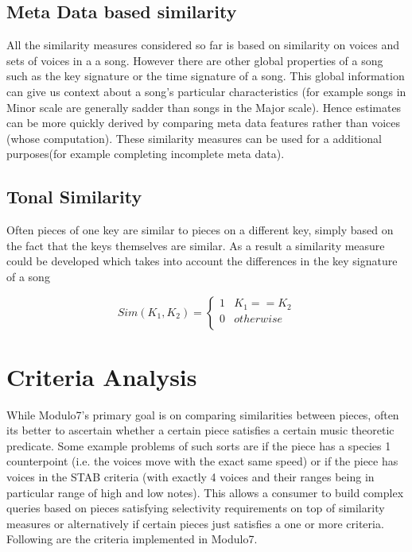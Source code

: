 \subsection{Meta Data based similarity}

\noindent All the similarity measures considered so far is based on similarity on voices and sets of voices in a a song. However there are other global properties of a song such as the key signature or the time signature of a song. This global information can give us context about a song's particular characteristics (for example songs in Minor scale are generally sadder than songs in the Major scale). Hence estimates can be more quickly derived by comparing meta data features rather than voices (whose computation). These similarity measures can be used for a additional purposes(for example completing incomplete meta data). 

\subsection{Tonal Similarity}

\noindent Often pieces of one key are similar to pieces on a different key, simply based on the fact that the keys themselves are similar. As a result a similarity measure could be developed which takes into account the differences in the key signature of a song

\begin{equation}
Sim(K_1, K_2) = \begin{cases} 
      1 & K_1 == K_2 \\
      0 & otherwise \\  \end{cases}
\end{equation}

\section{Criteria Analysis} \label{criteria}

\noindent While Modulo7's primary goal is on comparing similarities between pieces, often its better to ascertain whether a certain piece satisfies a certain music theoretic predicate. Some example problems of such sorts are if the piece has a species 1 counterpoint (i.e. the voices move with the exact same speed) or if the piece has voices in the STAB criteria (with exactly 4 voices and their ranges being in particular range of high and low notes). This allows a consumer to build complex queries based on pieces satisfying selectivity requirements on top of similarity measures or alternatively if certain pieces just satisfies a one or more criteria. Following are the criteria implemented in Modulo7.

